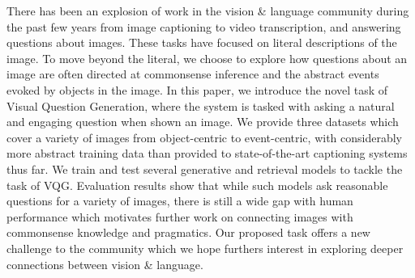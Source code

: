 There has been an explosion of work in the vision \& language community during the past few years from image captioning to video transcription, and answering questions about images. These tasks have focused on literal descriptions of the image. To move beyond the literal, we choose to explore how questions about an image are often directed at commonsense inference and the abstract events evoked by objects in the image. In this paper, we introduce the novel task of Visual Question Generation, where the system is tasked with asking a natural and engaging question when shown an image. We provide three datasets which cover a variety of images from object-centric to event-centric, with considerably more abstract training data than provided to state-of-the-art captioning systems thus far. We train and test several generative and retrieval models to tackle the task of VQG. Evaluation results show that while such models ask reasonable questions for a variety of images, there is still a wide gap with human performance which motivates further work on connecting images with commonsense knowledge and pragmatics. Our proposed task offers a new challenge to the community which we hope furthers interest in exploring deeper connections between vision \& language.
